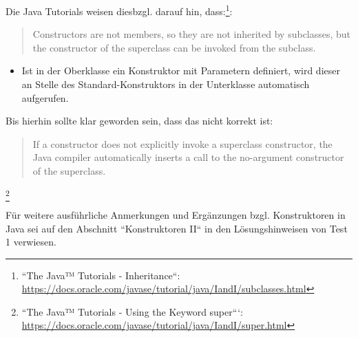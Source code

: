 Die Java Tutorials weisen diesbzgl. darauf hin, dass:\footnote{
``The Java™ Tutorials - Inheritance``: \url{https://docs.oracle.com/javase/tutorial/java/IandI/subclasses.html}
}:~\blockquote{
Constructors are not members, so they are not inherited by subclasses, but the constructor of the superclass can be invoked from the subclass.
}

\begin{itemize}
\item Ist in der Oberklasse ein Konstruktor mit Parametern definiert, wird dieser an Stelle des Standard-Konstruktors in der Unterklasse automatisch aufgerufen.
\end{itemize}

Bis hierhin sollte klar geworden sein, dass das nicht korrekt ist:~\blockquote{
 If a constructor does not explicitly invoke a superclass constructor, the Java compiler automatically inserts a call to the no-argument constructor of the superclass.
 }\footnote{
 ``The Java™ Tutorials - Using the Keyword super```: \url{https://docs.oracle.com/javase/tutorial/java/IandI/super.html}
 }

Für weitere ausführliche Anmerkungen und Ergänzungen bzgl. Konstruktoren in Java sei auf den Abschnitt ``Konstruktoren II`` in den Lösungshinweisen von Test 1 verwiesen.